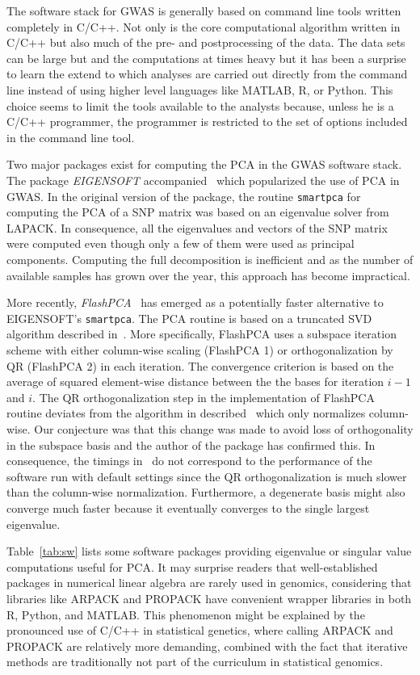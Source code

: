 \documentclass[review]{siamart0516}
\begin{document}
The software stack for GWAS is generally based on command line tools written completely in C/C++. Not only is the core computational algorithm written in C/C++ but also much of the pre- and postprocessing of the data. The data sets can be large but and the computations at times heavy but it has been a surprise to learn the extend to which analyses are carried out directly from the command line instead of using higher level languages like MATLAB, R, or Python. This choice seems to limit the tools available to the analysts because, unless he is a C/C++ programmer, the programmer is restricted to the set of options included in the command line tool.

Two major packages exist for computing the PCA in the GWAS software stack. The package \emph{EIGENSOFT} accompanied~\cite{Patterson2006} which popularized the use of PCA in GWAS. In the original version of the package, the routine \texttt{smartpca} for computing the PCA of a SNP matrix was based on an eigenvalue solver from LAPACK. In consequence, all the eigenvalues and vectors of the SNP matrix were computed even though only a few of them were used as principal components. Computing the full decomposition is inefficient and as the number of available samples has grown over the year, this approach has become impractical.

More recently, \emph{FlashPCA}~\cite{abraham2014fast} has emerged as a potentially faster alternative to EIGENSOFT's \texttt{smartpca}. The PCA routine is based on a truncated SVD algorithm described in~\cite{halko2011finding}. More specifically, FlashPCA uses a subspace iteration scheme with either column-wise scaling (FlashPCA 1) or orthogonalization by QR (FlashPCA 2) in each iteration. The convergence criterion is based on the average of squared element-wise distance between the the bases for iteration $i-1$ and $i$. The QR orthogonalization step in the implementation of FlashPCA routine deviates from the algorithm in described~\cite{abraham2014fast} which only normalizes column-wise. Our conjecture was that this change was made to avoid loss of orthogonality in the subspace basis and the author of the package has confirmed this. In consequence, the timings in~\cite{abraham2014fast} do not correspond to the performance of the software run with default settings since the QR orthogonalization is much slower than the column-wise normalization. Furthermore, a degenerate basis might also converge much faster because it eventually converges to the single largest eigenvalue.

Table~\ref{tab:sw} lists some software packages providing eigenvalue or singular
value computations useful for PCA. It may surprise readers that well-established
packages in numerical linear algebra are rarely used in genomics, considering
that libraries like ARPACK and PROPACK have convenient wrapper libraries in both
R, Python, and \textsc{MATLAB}. This phenomenon might be explained by the pronounced use
of C/C++ in statistical genetics, where calling ARPACK and PROPACK are relatively
more demanding, combined with the fact that iterative methods are traditionally
not part of the curriculum in statistical genomics.
\end{document}
